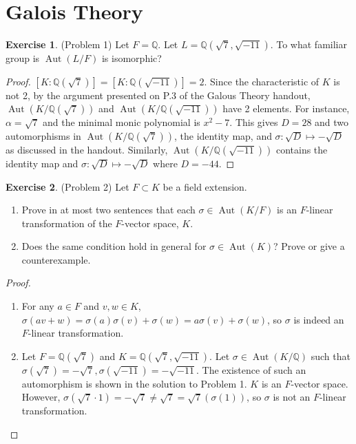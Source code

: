 \documentclass[12pt, psamsfonts]{amsart}
\theoremstyle{definition}
\newtheorem*{exer}{Exercise}
\theoremstyle{remark}
\DeclareMathOperator{\Aut}{Aut}
\numberwithin{equation}{section}
\begin{document}
\section{Galois Theory}

\begin{exer}{(Problem 1)}
  Let $F = \mathbb{Q}$.
  Let $L = \mathbb{Q}(\sqrt{7}, \sqrt{-11})$.
  To what familiar group is $\Aut(L/F)$ is isomorphic?
\end{exer}

\begin{proof}
  $[K:\mathbb{Q}(\sqrt{7})] = [K:\mathbb{Q}(\sqrt{-11})] = 2$.
  Since the characteristic of $K$ is not 2, by the argument presented on P.3 of the Galous Theory handout, $\Aut(K/\mathbb{Q}(\sqrt{7}))$ and $\Aut(K/\mathbb{Q}(\sqrt{-11}))$ have 2 elements.
  For instance, $\alpha = \sqrt{7}$ and the minimal monic polynomial is $x^2 - 7$.
  This gives $D = 28$ and two automorphisms in $\Aut(K/\mathbb{Q}(\sqrt{7}))$, the identity map, and $\sigma: \sqrt{D} \mapsto -\sqrt{D}$ as discussed in the handout.
  Similarly, $\Aut(K/\mathbb{Q}(\sqrt{-11}))$ contains the identity map and $\sigma: \sqrt{D} \mapsto -\sqrt{D}$ where $D = -44$.
\end{proof}

\begin{exer}{(Problem 2)}
  Let $F \subset K$ be a field extension.
  \begin{enumerate}
    \item 
      Prove in at most two sentences that each $\sigma \in \Aut(K / F)$ is an $F$-linear transformation of the $F$-vector space, $K$.
    \item
      Does the same condition hold in general for $\sigma \in \Aut(K)$?
      Prove or give a counterexample.
  \end{enumerate}
\end{exer}

\begin{proof}
  $ $
  \begin{enumerate}
    \item 
      For any $a \in F$ and $v, w \in K$, $\sigma(av + w) = \sigma(a)\sigma(v) + \sigma(w) = a\sigma(v) + \sigma(w)$, so $\sigma$ is indeed an $F$-linear transformation.
    \item
      Let $F = \mathbb{Q}(\sqrt{7})$ and $K = \mathbb{Q}(\sqrt{7}, \sqrt{-11})$.
      Let $\sigma \in \Aut(K / \mathbb{Q})$ such that $\sigma(\sqrt{7}) = -\sqrt{7}, \sigma(\sqrt{-11}) = -\sqrt{-11}$.
      The existence of such an automorphism is shown in the solution to Problem 1.
      $K$ is an $F$-vector space.
      However, $\sigma(\sqrt{7} \cdot 1) = -\sqrt{7} \ne \sqrt{7} = \sqrt{7}(\sigma(1))$, so $\sigma$ is not an $F$-linear transformation.
  \end{enumerate}
\end{proof}
\end{document}
